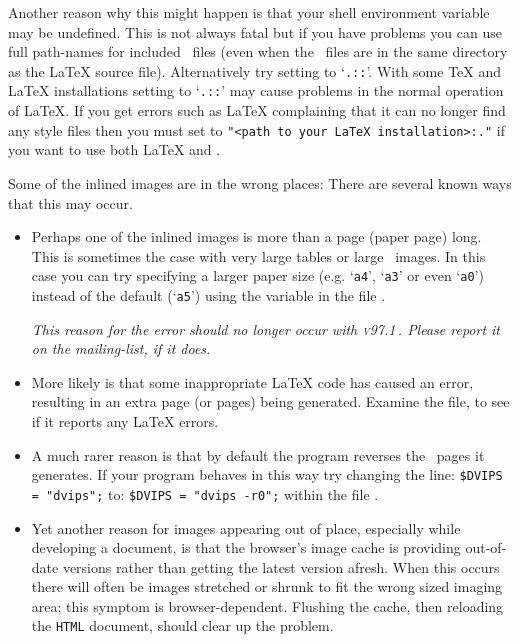 \begin{htmllist}
Another reason why this might happen is that your shell environment variable
 may be undefined. This is not always
fatal but if you have problems you can use full
path-names for included \PS\ files (even when the \PS\
files are in the same directory as the \LaTeX{} source file).
Alternatively try setting  to `\texttt{.::}'.
With some \TeX{} and \LaTeX{} installations setting  to
`\texttt{.::}' may cause problems in the normal operation of \LaTeX.
If you get errors such as \LaTeX{} complaining that it can no longer find
any style files then you must set \fn{TEXINPUTS} to
\verb|"<path to your LaTeX installation>:."|
if you want to use both \LaTeX{} and \latextohtml{}.

\item [Some of the inlined images are in the wrong places: ]
There are several known ways that this may occur.
\begin{itemize}
\item
Perhaps one of the inlined images is more than a page (paper page) long.
This is sometimes the case with very large tables
or large \PS\ images. In this case you can try specifying
a larger paper size (e.g. `\texttt{a4}', `\texttt{a3}' or even `\texttt{a0}')
instead of the default (`\texttt{a5}')
using the \latextohtml{} variable 
in the file .

\smallskip\noindent
\textit{This reason for the error should no longer occur with \textsc{v97.1}\,.
Please report it on the mailing-list, if it does.}

\item
More likely is that some inappropriate \LaTeX{} code
has caused an error, resulting in an extra page (or pages) being generated.
Examine the \fn{images.log} file, to see if it reports any \LaTeX{} errors.

\item
A much rarer reason is that by default the  program
reverses the \PS\ pages it generates. If your \fn{dvips} program
behaves in this way try changing the line: \html{\\}
\verb|$DVIPS = "dvips";| \html{\\}
to: \html{\\}
\verb|$DVIPS = "dvips -r0";| \html{\\}
within the file .

\item
Yet another reason for images appearing out of place, especially while
developing a document, is that the browser's image cache is providing
out-of-date versions rather than getting the latest version afresh.
When this occurs there will often be images stretched or shrunk
to fit the wrong sized imaging area; this symptom is browser-dependent.
Flushing the cache, then reloading the \texttt{HTML} document, should
clear up the problem.
\end{itemize}



\end{htmllist}
